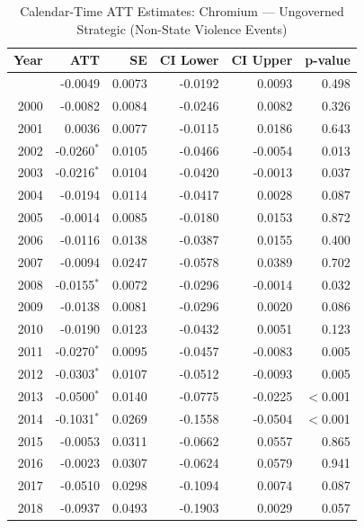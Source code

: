 \begin{longtable}{rrrrrr}
\caption{Calendar-Time ATT Estimates: Chromium --- Ungoverned Strategic (Non-State Violence Events)} \label{tab:cal_chromium} \\
\toprule
\textbf{Year} & \textbf{ATT} & \textbf{SE} & \textbf{CI Lower} & \textbf{CI Upper} & \textbf{p-value} \\
\midrule
\endfirsthead
\bottomrule
\endlastfoot
1999 & -0.0049 & 0.0073 & -0.0192 & 0.0093 & 0.498 \\
2000 & -0.0082 & 0.0084 & -0.0246 & 0.0082 & 0.326 \\
2001 & 0.0036 & 0.0077 & -0.0115 & 0.0186 & 0.643 \\
2002 & -0.0260$^{*}$ & 0.0105 & -0.0466 & -0.0054 & 0.013 \\
2003 & -0.0216$^{*}$ & 0.0104 & -0.0420 & -0.0013 & 0.037 \\
2004 & -0.0194 & 0.0114 & -0.0417 & 0.0028 & 0.087 \\
2005 & -0.0014 & 0.0085 & -0.0180 & 0.0153 & 0.872 \\
2006 & -0.0116 & 0.0138 & -0.0387 & 0.0155 & 0.400 \\
2007 & -0.0094 & 0.0247 & -0.0578 & 0.0389 & 0.702 \\
2008 & -0.0155$^{*}$ & 0.0072 & -0.0296 & -0.0014 & 0.032 \\
2009 & -0.0138 & 0.0081 & -0.0296 & 0.0020 & 0.086 \\
2010 & -0.0190 & 0.0123 & -0.0432 & 0.0051 & 0.123 \\
2011 & -0.0270$^{*}$ & 0.0095 & -0.0457 & -0.0083 & 0.005 \\
2012 & -0.0303$^{*}$ & 0.0107 & -0.0512 & -0.0093 & 0.005 \\
2013 & -0.0500$^{*}$ & 0.0140 & -0.0775 & -0.0225 & $<$0.001 \\
2014 & -0.1031$^{*}$ & 0.0269 & -0.1558 & -0.0504 & $<$0.001 \\
2015 & -0.0053 & 0.0311 & -0.0662 & 0.0557 & 0.865 \\
2016 & -0.0023 & 0.0307 & -0.0624 & 0.0579 & 0.941 \\
2017 & -0.0510 & 0.0298 & -0.1094 & 0.0074 & 0.087 \\
2018 & -0.0937 & 0.0493 & -0.1903 & 0.0029 & 0.057 \\
\end{longtable}
